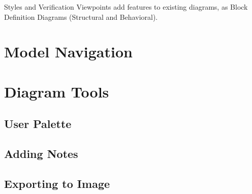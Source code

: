 Styles and Verification Viewpoints add features to existing diagrams, as Block Definition Diagrams (Structural and Behavioral).

\section{Model Navigation}
\section{Diagram Tools}
\subsection{User Palette}
\subsection{Adding Notes}
\subsection{Exporting to Image}
